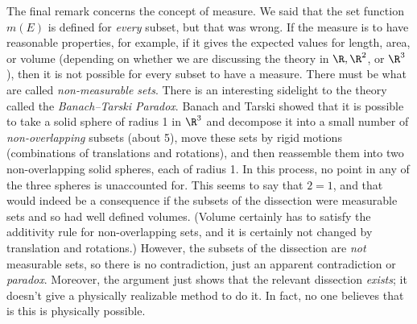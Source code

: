The final remark concerns the concept of measure.  We said that
the set function $m(E)$ is defined for {\it every\/} subset,
but that was wrong.   If the measure is to have reasonable
properties, for example, if it gives the expected values
for length, area, or volume (depending on whether we are
discussing the theory in $\R, \R^2$, or $\R^3$), then it
is not possible for every subset to have a measure.  There
must be what are called {\it non-measurable sets\/}.   There
is an interesting sidelight to the theory called the
{\it Banach--Tarski Paradox}.   Banach and Tarski 
%
 showed that
it is possible to take a solid sphere of radius 1 in
$\R^3$ and decompose it into a small number of
{\it non-overlapping\/} subsets
(about 5), move these sets by rigid motions (combinations
of translations and rotations), and then reassemble them
into two non-overlapping solid spheres, each of radius 1.
In this process, no point in  any of
the three spheres is unaccounted for.   This seems
to say that $2 = 1$, and that would indeed be a consequence
if the subsets of the dissection were measurable sets and
so had well defined volumes.   (Volume certainly has to
satisfy  the additivity rule for non-overlapping sets, and
it is certainly not changed by translation and rotations.)
However, the subsets of the dissection are {\it not\/}
measurable sets, so there is no contradiction, just an
apparent contradiction or {\it paradox}.
Moreover, the argument just shows
that  the relevant dissection {\it exists};
it doesn't  give a physically realizable method to do it.
  In fact, no one believes
that is this is physically possible.


\endchapter
{}
\enddocument
